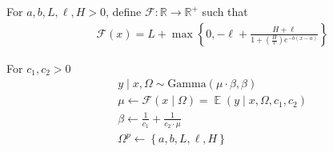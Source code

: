 \documentclass[a4paper,12pt]{article}
\DeclareMathOperator{\E}{\mathbb{E}}
\begin{document}
    For $a, b, L, \ell, H > 0$, define $\mathcal{F}: \mathbb{R} \to \mathbb{R}^{+}$ such that
    \begin{align*}
        &\mathcal{F}\left(x\right) = L + \max\left\{0, -\ell + \frac{H + \ell}{1 + \left(\frac{H}{\ell}\right)e^{-b\left(x-a\right)}} \right\} \tag{4.2.1}
    \end{align*}


For $c_1, c_2 > 0$
    \begin{align*}
        &y \mid x, \Omega \sim \text{Gamma}\left(\mu\cdot\beta, \beta\right) \tag{4.2.2}\\
        &\mu \gets \mathcal{F}\left(x \mid \Omega\right) = \E\left(y \mid x, \Omega, c_1, c_2\right) \tag{4.2.3}\\
        &\beta \gets \frac{1}{c_1} + \frac{1}{c_2\cdot\mu} \tag{4.2.2}\\
        &{\Omega}^{p} \gets \left\{a, b, L, \ell, H\right\} \tag{4.2.4}\\
    \end{align*}
\end{document}
